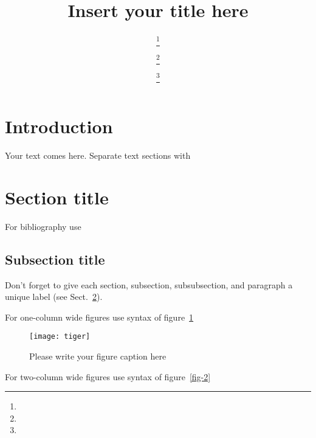 \documentclass{webofc}
\begin{document}
%
\title{Insert your title here}
%
%

\author{ \fnsep\thanks{} \and
         \fnsep\thanks{} \and
         \fnsep\thanks{}
}


%
\maketitle
%
\section{Introduction}
\label{intro}
Your text comes here. Separate text sections with
\section{Section title}
\label{sec-1}
For bibliography use \cite{RefJ}
\subsection{Subsection title}
\label{sec-2}
Don't forget to give each section, subsection, subsubsection, and
paragraph a unique label (see Sect.~\ref{sec-1}).

For one-column wide figures use syntax of figure~\ref{fig-1}
\begin{figure}[h]
\centering
\texttt{[image: tiger]}
\caption{Please write your figure caption here}
\label{fig-1}       %
\end{figure}

For two-column wide figures use syntax of figure~\ref{fig-2}
\begin{figure*}
\centering
\vspace*{5cm}       %
\caption{Please write your figure caption here}
\label{fig-2}       %
\end{figure*}
\end{document}
